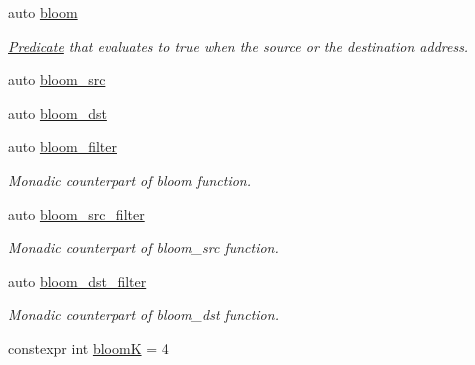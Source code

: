 \begin{DoxyCompactItemize}
auto \hyperlink{namespacepfq_1_1lang_1_1anonymous__namespace_02default_8hpp_03_abfcd230137acb93cfd99f7a0a7c1f17f}{bloom}
\begin{DoxyCompactList}\small\item\em \hyperlink{structpfq_1_1lang_1_1Predicate}{Predicate} that evaluates to {\ttfamily true} when the source or the destination address. \end{DoxyCompactList}\item 
auto \hyperlink{namespacepfq_1_1lang_1_1anonymous__namespace_02default_8hpp_03_aa2a8ff506d61e93d8eca4419513970f4}{bloom\+\_\+src}
\item 
auto \hyperlink{namespacepfq_1_1lang_1_1anonymous__namespace_02default_8hpp_03_ac1c667000a13acfbda8490d5748b91c4}{bloom\+\_\+dst}
\item 
auto \hyperlink{namespacepfq_1_1lang_1_1anonymous__namespace_02default_8hpp_03_a3a5eda5d7a49e279941725df8388378d}{bloom\+\_\+filter}
\begin{DoxyCompactList}\small\item\em Monadic counterpart of {\ttfamily bloom} function. \end{DoxyCompactList}\item 
auto \hyperlink{namespacepfq_1_1lang_1_1anonymous__namespace_02default_8hpp_03_a04d4dfefacab3230f7d17f0f797cd37e}{bloom\+\_\+src\+\_\+filter}
\begin{DoxyCompactList}\small\item\em Monadic counterpart of {\ttfamily bloom\+\_\+src} function. \end{DoxyCompactList}\item 
auto \hyperlink{namespacepfq_1_1lang_1_1anonymous__namespace_02default_8hpp_03_a71aa2d21ceb343786b3911801eb0741b}{bloom\+\_\+dst\+\_\+filter}
\begin{DoxyCompactList}\small\item\em Monadic counterpart of {\ttfamily bloom\+\_\+dst} function. \end{DoxyCompactList}\item 
constexpr int \hyperlink{namespacepfq_1_1lang_1_1anonymous__namespace_02default_8hpp_03_a56750cdea1537acfa24c256b64924004}{bloom\+K} = 4
\end{DoxyCompactItemize}


